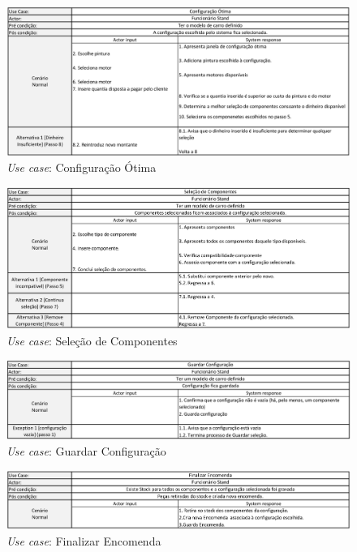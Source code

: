 \begin{figure}[ht]
    \centering
    \includegraphics[width=\textwidth]{analise_de_requisitos/img/use_cases/configuracao_otima.png}
    \caption{\textit{Use case}: Configuração Ótima}
    \label{fig:uc_configuracao_otima}
\end{figure}

\begin{figure}[ht]
    \centering
    \includegraphics[width=\textwidth]{analise_de_requisitos/img/use_cases/selecao_componentes.png}
    \caption{\textit{Use case}: Seleção de Componentes}
    \label{fig:uc_selecao_componentes}
\end{figure}

\begin{figure}[ht]
    \centering
    \includegraphics[width=\textwidth]{analise_de_requisitos/img/use_cases/guardar_configuracao.png}
    \caption{\textit{Use case}: Guardar Configuração}
    \label{fig:uc_guardar_configuracao}
\end{figure}

\begin{figure}[ht]
    \centering
    \includegraphics[width=\textwidth]{analise_de_requisitos/img/use_cases/finalizar_encomenda.png}
    \caption{\textit{Use case}: Finalizar Encomenda}
    \label{fig:uc_finalizar_encomenda}
\end{figure}

